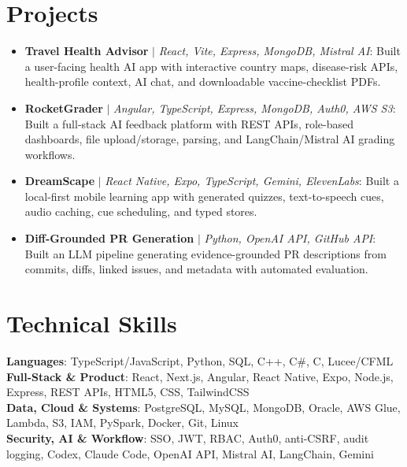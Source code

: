 \documentclass[letterpaper,11pt]{article}
\begin{document}
\section{Projects}
\begin{itemize}[leftmargin=0.15in, label={}, itemsep=1pt, topsep=1pt, parsep=0pt]
  \item\small{\textbf{Travel Health Advisor} $|$ \emph{React, Vite, Express, MongoDB, Mistral AI}: Built a user-facing health AI app with interactive country maps, disease-risk APIs, health-profile context, AI chat, and downloadable vaccine-checklist PDFs.}
  \item\small{\textbf{RocketGrader} $|$ \emph{Angular, TypeScript, Express, MongoDB, Auth0, AWS S3}: Built a full-stack AI feedback platform with REST APIs, role-based dashboards, file upload/storage, parsing, and LangChain/Mistral AI grading workflows.}
  \item\small{\textbf{DreamScape} $|$ \emph{React Native, Expo, TypeScript, Gemini, ElevenLabs}: Built a local-first mobile learning app with generated quizzes, text-to-speech cues, audio caching, cue scheduling, and typed stores.}
  \item\small{\textbf{Diff-Grounded PR Generation} $|$ \emph{Python, OpenAI API, GitHub API}: Built an LLM pipeline generating evidence-grounded PR descriptions from commits, diffs, linked issues, and metadata with automated evaluation.}
\end{itemize}\vspace{-7pt}

\section{Technical Skills}
 \begin{itemize}[leftmargin=0.15in, label={}]
    \small{\item{
     \textbf{Languages}{: TypeScript/JavaScript, Python, SQL, C++, C\#, C, Lucee/CFML} \\
     \textbf{Full-Stack \& Product}{: React, Next.js, Angular, React Native, Expo, Node.js, Express, REST APIs, HTML5, CSS, TailwindCSS} \\
     \textbf{Data, Cloud \& Systems}{: PostgreSQL, MySQL, MongoDB, Oracle, AWS Glue, Lambda, S3, IAM, PySpark, Docker, Git, Linux} \\
     \textbf{Security, AI \& Workflow}{: SSO, JWT, RBAC, Auth0, anti-CSRF, audit logging, Codex, Claude Code, OpenAI API, Mistral AI, LangChain, Gemini}
    }}
 \end{itemize}
\end{document}
